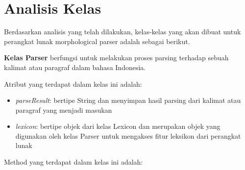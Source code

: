 \section{Analisis Kelas}
\label{sec:AnalisisKelasAwal}

Berdasarkan analisis yang telah dilakukan, kelas-kelas yang akan dibuat untuk perangkat lunak morphological parser adalah sebagai berikut.

\textbf{Kelas Parser} berfungsi untuk melakukan proses parsing terhadap sebuah kalimat atau paragraf dalam bahasa Indonesia.

Atribut yang terdapat dalam kelas ini adalah:

\begin{itemize}
	\item \textit{parseResult}: bertipe String dan menyimpan hasil parsing dari kalimat atau paragraf yang menjadi masukan
	\item \textit{lexicon}: bertipe objek dari kelas Lexicon dan merupakan objek yang digunakan oleh kelas Parser untuk mengakses fitur leksikon dari perangkat lunak
\end{itemize}

Method yang terdapat dalam kelas ini adalah:


